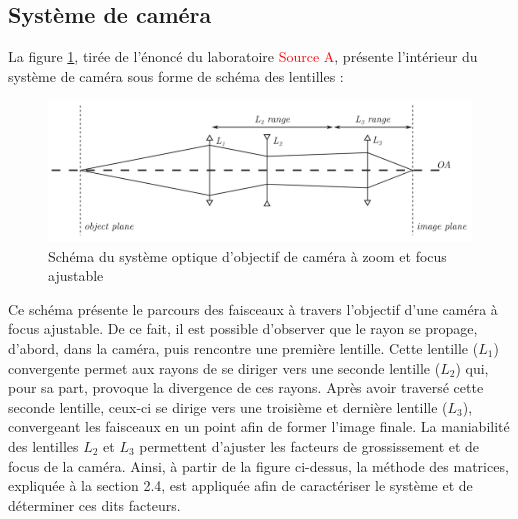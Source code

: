 \documentclass[11pt,letterpaper]{article}
\begin{document}

\subsection{Système de caméra}

La figure \ref{schema_syst}, tirée de l'énoncé du laboratoire \textcolor{red}{Source A}, présente
l'intérieur du système de caméra sous forme de schéma des lentilles :

\begin{figure}[H]
  \centering
  \includegraphics[scale=0.2]{systeme_optique.png}
  \caption{Schéma du système optique d'objectif de caméra à zoom et focus ajustable}
  \label{schema_syst}
\end{figure}

Ce schéma présente le parcours des faisceaux à travers l'objectif d'une caméra à focus ajustable. De ce fait, il est possible d'observer que le rayon se propage, d'abord, dans la caméra, puis rencontre une première lentille. Cette lentille ($L_1$) convergente permet aux rayons de se diriger vers une seconde lentille ($L_2$) qui, pour sa part, provoque la divergence de ces rayons. Après avoir traversé cette seconde lentille, ceux-ci se dirige vers une troisième et dernière lentille ($L_3$), convergeant les faisceaux en un point afin de former l'image finale. La maniabilité des lentilles $L_2$ et $L_3$ permettent d'ajuster les facteurs de grossissement et de focus de la caméra. Ainsi, à partir de la figure ci-dessus, la méthode des matrices, expliquée à la section 2.4, est appliquée afin de caractériser le système et de déterminer ces dits facteurs.

\end{document}
